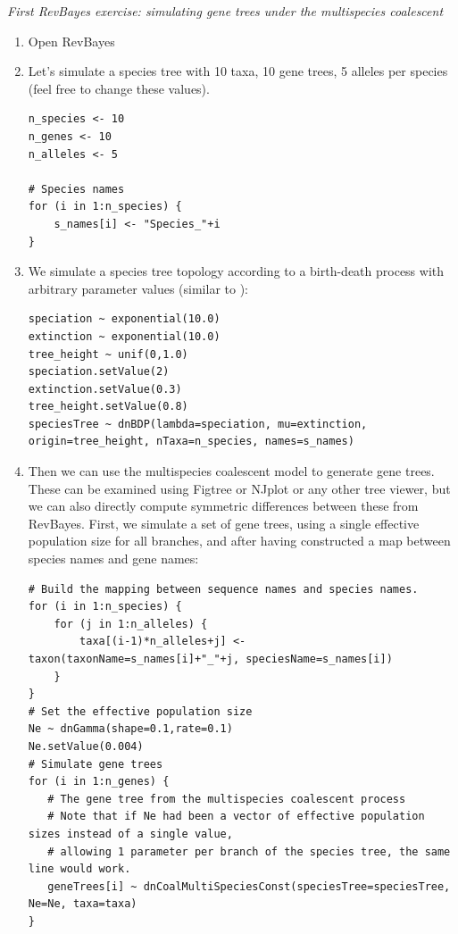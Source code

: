 \documentclass[11pt]{article}
\begin{document}
{\begin{framed}

\begin{center}
\emph{First RevBayes exercise: simulating gene trees under the multispecies coalescent}
\end{center}
\begin{enumerate}
\item Open RevBayes
\item Let's simulate a species tree with 10 taxa, 10 gene trees, 5 alleles per species (feel free to change these values).
{\tt \begin{snugshade*}
\begin{lstlisting}
n_species <- 10
n_genes <- 10
n_alleles <- 5

# Species names
for (i in 1:n_species) {
	s_names[i] <- "Species_"+i
}
\end{lstlisting}
\end{snugshade*}}
\item We simulate a species tree topology according to a birth-death process with arbitrary parameter values (similar to \citet{Leache2011}):
{\tt \begin{snugshade*}
\begin{lstlisting}
speciation ~ exponential(10.0)
extinction ~ exponential(10.0)
tree_height ~ unif(0,1.0)
speciation.setValue(2)
extinction.setValue(0.3)
tree_height.setValue(0.8)
speciesTree ~ dnBDP(lambda=speciation, mu=extinction, origin=tree_height, nTaxa=n_species, names=s_names)
\end{lstlisting}
\end{snugshade*}}
\item Then we can use the multispecies coalescent model to generate gene trees. These can be examined using Figtree or NJplot or any other tree viewer, but we can also directly compute symmetric differences between these from RevBayes. First, we simulate a set of gene trees, using a single effective population size for all branches, and after having constructed a map between species names and gene names:
{\tt \begin{snugshade*}
\begin{lstlisting}
# Build the mapping between sequence names and species names.
for (i in 1:n_species) {
	for (j in 1:n_alleles) {
		taxa[(i-1)*n_alleles+j] <- taxon(taxonName=s_names[i]+"_"+j, speciesName=s_names[i])
	}
}
# Set the effective population size
Ne ~ dnGamma(shape=0.1,rate=0.1)
Ne.setValue(0.004)
# Simulate gene trees
for (i in 1:n_genes) {
   # The gene tree from the multispecies coalescent process
   # Note that if Ne had been a vector of effective population sizes instead of a single value, 
   # allowing 1 parameter per branch of the species tree, the same line would work.
   geneTrees[i] ~ dnCoalMultiSpeciesConst(speciesTree=speciesTree, Ne=Ne, taxa=taxa)
}
\end{lstlisting}
\end{snugshade*}}


\end{enumerate}
\end{framed}}
\end{document}
